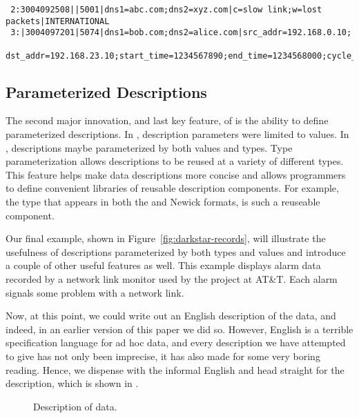\begin{figure*}
  \centering
  \small
\begin{verbatim}
 2:3004092508||5001|dns1=abc.com;dns2=xyz.com|c=slow link;w=lost packets|INTERNATIONAL
 3:|3004097201|5074|dns1=bob.com;dns2=alice.com|src_addr=192.168.0.10;
 dst_addr=192.168.23.10;start_time=1234567890;end_time=1234568000;cycle_time=17412|SPECIAL
\end{verbatim}  
  \caption{Simplified network monitoring data.  This 
data containts two alarm records.  Extra newlines 
were inserted mid-record so the data would fit on a page.}
  \label{fig:darkstar-records}
\end{figure*}

\subsection{Parameterized Descriptions}

The second major innovation, and last key feature, of \padsml{} is the
ability to define parameterized descriptions.  In \pads, description
parameters were limited to values.  In \padsml, descriptions maybe
parameterized by both values and types.  Type parameterization allows
descriptions to be reused at a variety of different types.  This
feature helps make data descriptions more concise and allows
programmers to define convenient libraries of reusable description
components. For example, the  type that appears in both the
\dibbler{} and Newick formats, is such a reuseable component.

Our final example, shown in Figure~\ref{fig:darkstar-records}, will
illustrate the usefulness of descriptions parameterized by both types
and values and introduce a couple of other useful features as well.
This example displays alarm data recorded by a network link monitor
used by the \darkstar{} project at AT\&T.  Each alarm signals some
problem with a network link.

Now, at this point, we could write out an English description
of the \darkstar{} data, and indeed, in an earlier version of this paper
we did so.  However, English is a terrible specification language
for ad hoc data, and every description we have attempted to give has not 
only been imprecise, it has also made for some very 
boring reading.  Hence, we dispense with the informal
English and head straight for the \padsml{} description,
which is shown in .

\begin{figure}
  \centering
  \small
  \begin{code}
    
  \end{code}
  \caption{Description of \darkstar{} data.}
  \label{fig:darkstar-ml}
\end{figure}

